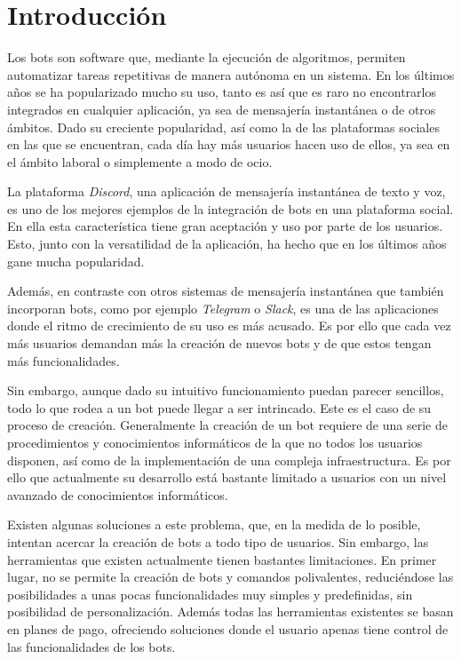 \chapter{Introducción}

Los bots son software que, mediante la ejecución de algoritmos, permiten automatizar tareas repetitivas de manera autónoma en un sistema. En los últimos años se ha popularizado mucho su uso, tanto es así que es raro no encontrarlos integrados en cualquier aplicación, ya sea de mensajería instantánea o de otros ámbitos. Dado su creciente popularidad, así como la de las plataformas sociales en las que se encuentran, cada día hay más usuarios hacen uso de ellos, ya sea en el ámbito laboral o simplemente a modo de ocio.

La plataforma \textit{Discord}, una aplicación de mensajería instantánea de texto y voz, es uno de los mejores ejemplos de la integración de bots en una plataforma social. En ella esta característica tiene gran aceptación y uso por parte de los usuarios. Esto, junto con la versatilidad de la aplicación, ha hecho que en los últimos años gane mucha popularidad\cite{tsbb}. 

Además, en contraste con otros sistemas de mensajería instantánea que también incorporan bots, como por ejemplo \textit{Telegram} o \textit{Slack}, es una de las aplicaciones donde el ritmo de crecimiento de su uso es más acusado. Es por ello que cada vez más usuarios demandan más la creación de nuevos bots y de que estos tengan más funcionalidades\cite{enlyft}.

Sin embargo, aunque dado su intuitivo funcionamiento puedan parecer sencillos, todo lo que rodea a un bot puede llegar a ser intrincado. Este es el caso de su proceso de creación. Generalmente la creación de un bot requiere de una serie de procedimientos y conocimientos informáticos de la que no todos los usuarios disponen, así como de la implementación de una compleja infraestructura. Es por ello que actualmente su desarrollo está bastante limitado a usuarios con un nivel avanzado de conocimientos informáticos.

Existen algunas soluciones a este problema, que, en la medida de lo posible, intentan acercar la creación de bots a todo tipo de usuarios. Sin embargo, las herramientas que existen actualmente tienen bastantes limitaciones. En primer lugar, no se permite la creación de bots y comandos polivalentes, reduciéndose las posibilidades a unas pocas funcionalidades muy simples y predefinidas, sin posibilidad de personalización. Además todas las herramientas existentes se basan en planes de pago, ofreciendo soluciones donde el usuario apenas tiene control de las funcionalidades de los bots.

